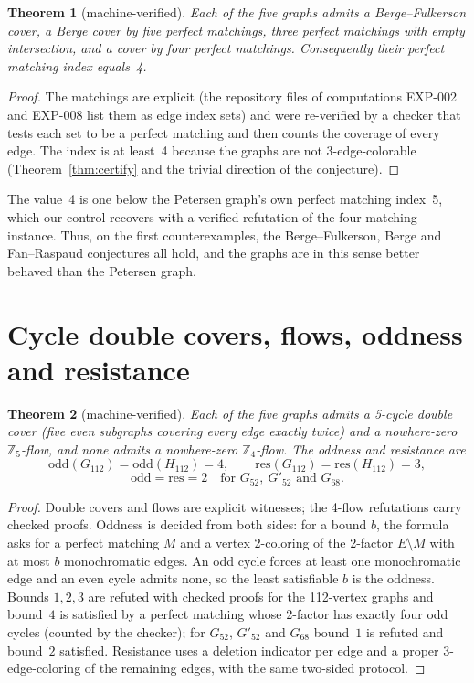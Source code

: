 \documentclass[11pt]{article}
\newtheorem{theorem}{Theorem}[section]
\theoremstyle{definition}
\theoremstyle{remark}
\newcommand{\Gmain}{G_{112}}
\newcommand{\Gsym}{H_{112}}
\newcommand{\Gfty}{G_{52}}
\newcommand{\Gftyb}{G'_{52}}
\newcommand{\Gsix}{G_{68}}
\newcommand{\Zfive}{\mathbb{Z}_5}
\begin{document}
\begin{theorem}[machine-verified]\label{thm:covers}
Each of the five graphs admits a Berge--Fulkerson cover, a Berge cover by five perfect
matchings, three perfect matchings with empty intersection, and a cover by four perfect
matchings. Consequently their perfect matching index equals~4.
\end{theorem}

\begin{proof}
The matchings are explicit (the repository files of computations EXP-002 and EXP-008
list them as edge index sets) and were re-verified by a checker that tests each set to be a perfect
matching and then counts the coverage of every edge. The index is at least~4 because the graphs
are not 3-edge-colorable (Theorem~\ref{thm:certify} and the trivial direction of the conjecture).
\end{proof}

The value~4 is one below the Petersen graph's own perfect matching index~5, which our control
recovers with a verified refutation of the four-matching instance. Thus, on the first
counterexamples, the Berge--Fulkerson, Berge and Fan--Raspaud conjectures all hold, and the
graphs are in this sense better behaved than the Petersen graph.

\section{Cycle double covers, flows, oddness and resistance}\label{sec:cdc}

\begin{theorem}[machine-verified]\label{thm:cdc}
Each of the five graphs admits a 5-cycle double cover (five even subgraphs covering
every edge exactly twice) and a nowhere-zero $\Zfive$-flow, and none admits a nowhere-zero
$\mathbb{Z}_4$-flow. The oddness and resistance are
\[
\mathrm{odd}(\Gmain) = \mathrm{odd}(\Gsym) = 4,\qquad \mathrm{res}(\Gmain) = \mathrm{res}(\Gsym) = 3,
\]
\[
\mathrm{odd} = \mathrm{res} = 2 \quad\text{for } \Gfty,\ \Gftyb \text{ and } \Gsix .
\]
\end{theorem}

\begin{proof}
Double covers and flows are explicit witnesses; the 4-flow refutations carry checked proofs.
Oddness is decided from both sides: for a bound $b$, the formula asks for a perfect matching $M$
and a vertex 2-coloring of the 2-factor $E \setminus M$ with at most $b$ monochromatic edges. An
odd cycle forces at least one monochromatic edge and an even cycle admits none, so the least
satisfiable $b$ is the oddness. Bounds $1, 2, 3$ are refuted with checked proofs for the
112-vertex graphs and bound~$4$ is satisfied by a perfect matching whose 2-factor has exactly four
odd cycles (counted by the checker); for $\Gfty$, $\Gftyb$ and $\Gsix$ bound~$1$ is refuted and
bound~$2$ satisfied.
Resistance uses a deletion indicator per edge and a proper 3-edge-coloring of the remaining
edges, with the same two-sided protocol.
\end{proof}
\end{document}
